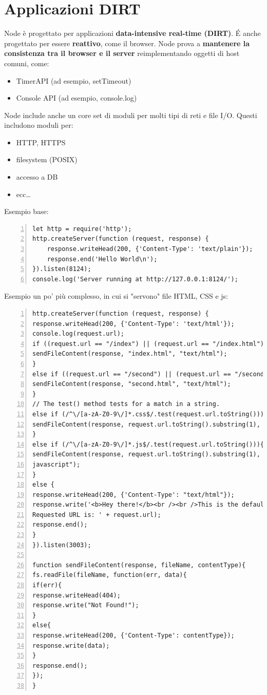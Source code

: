 \section{Applicazioni DIRT}
Node è progettato per applicazioni \textbf{data-intensive real-time (DIRT)}. \'E anche progettato per essere \textbf{reattivo}, come il browser. Node prova a \textbf{mantenere la consistenza tra il browser e il server} reimplementando oggetti di host comuni, come: 
\begin{itemize}
    \item TimerAPI (ad esempio, setTimeout)
    \item Console API (ad esempio, console.log)
\end{itemize}
Node include anche un core set di moduli per molti tipi di reti e file I/O. Questi includono moduli per:
\begin{itemize}
    \item HTTP, HTTPS
    \item filesystem (POSIX)
    \item accesso a DB
    \item ecc\dots
\end{itemize}

Esempio base:
\begin{Verbatim}[numbers = left, frame = single]
let http = require('http');
http.createServer(function (request, response) {
    response.writeHead(200, {'Content-Type': 'text/plain'});
    response.end('Hello World\n');
}).listen(8124);
console.log('Server running at http://127.0.0.1:8124/');
\end{Verbatim}

Esempio un po' più complesso, in cui si "servono" file HTML, CSS e js:
\begin{Verbatim}[frame = single, numbers = left]
http.createServer(function (request, response) {
response.writeHead(200, {'Content-Type': 'text/html'});
console.log(request.url);
if ((request.url == "/index") || (request.url == "/index.html")) {
sendFileContent(response, "index.html", "text/html");
}
else if ((request.url == "/second") || (request.url == "/second.html")) {
sendFileContent(response, "second.html", "text/html");
}
// The test() method tests for a match in a string.
else if (/^\/[a-zA-Z0-9\/]*.css$/.test(request.url.toString())) {
sendFileContent(response, request.url.toString().substring(1), "text/css");
}
else if (/^\/[a-zA-Z0-9\/]*.js$/.test(request.url.toString())){
sendFileContent(response, request.url.toString().substring(1), "text/
javascript");
}
else {
response.writeHead(200, {'Content-Type': "text/html"});
response.write('<b>Hey there!</b><br /><br />This is the default response.
Requested URL is: ' + request.url);
response.end();
}
}).listen(3003);

function sendFileContent(response, fileName, contentType){
fs.readFile(fileName, function(err, data){
if(err){
response.writeHead(404);
response.write("Not Found!");
}
else{
response.writeHead(200, {'Content-Type': contentType});
response.write(data);
}
response.end();
});
}
\end{Verbatim}

